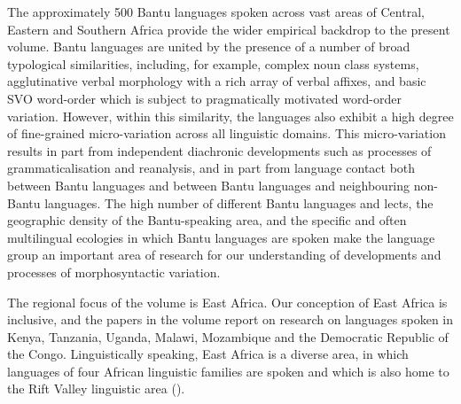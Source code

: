 \documentclass[output=paper]{langscibook}
\begin{document}
The approximately 500 Bantu languages spoken across vast areas of Central, Eastern and Southern Africa provide the wider empirical backdrop to the present volume. Bantu languages are united by the presence of a number of broad typological similarities, including, for example, complex noun class systems, agglutinative verbal morphology with a rich array of verbal affixes, and basic SVO word-order which is subject to pragmatically motivated word-order variation. However, within this similarity, the languages also exhibit a high degree of fine-grained micro-variation across all linguistic domains. This micro-variation results in part from independent diachronic developments such as processes of grammaticalisation and reanalysis, and in part from language contact both between Bantu languages and between Bantu languages and neighbouring non-Bantu languages. The high number of different Bantu languages and lects, the geographic density of the Bantu-speaking area, and the specific and often multilingual ecologies in which Bantu languages are spoken make the language group an important area of research for our understanding of developments and processes of morphosyntactic variation.

The regional focus of the volume is East Africa. Our conception of East Africa is inclusive, and the papers in the volume report on research on languages spoken in Kenya, Tanzania, Uganda, Malawi, Mozambique and the Democratic Republic of the Congo. Linguistically speaking, East Africa is a diverse area, in which languages of four African linguistic families are spoken and which is also home to the Rift Valley linguistic area (\citealt{KiesslingEtAl2007,HarveyEtAlForthcoming}).
\end{document}
